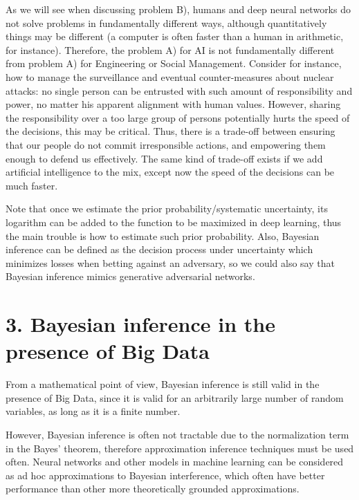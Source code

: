 \documentclass[11pt]{book}
\begin{document}
As we will see when discussing problem B), humans and deep neural
networks do not solve problems in fundamentally different ways, although
quantitatively things may be different (a computer is often faster than
a human in arithmetic, for instance). Therefore, the problem A) for AI
is not fundamentally different from problem A) for Engineering or Social
Management. Consider for instance, how to manage the surveillance and
eventual counter-measures about nuclear attacks: no single person can be
entrusted with such amount of responsibility and power, no matter his
apparent alignment with human values. However, sharing the
responsibility over a too large group of persons potentially hurts the
speed of the decisions, this may be critical. Thus, there is a trade-off
between ensuring that our people do not commit irresponsible actions,
and empowering them enough to defend us effectively. The same kind of
trade-off exists if we add artificial intelligence to the mix, except
now the speed of the decisions can be much faster.

Note that once we estimate the prior probability/systematic uncertainty,
its logarithm can be added to the function to be maximized in deep
learning, thus the main trouble is how to estimate such prior
probability. Also, Bayesian inference can be defined as the decision
process under uncertainty which minimizes losses when betting against an
adversary\cite{eaton_dutch_2004}, so we could also say that Bayesian inference mimics generative
adversarial
networks\cite{turner_metropolis-hastings_2019}.

\hypertarget{bayesian-inference-in-the-presence-of-big-data}{%
\section{3. Bayesian inference in the presence of Big
Data}\label{bayesian-inference-in-the-presence-of-big-data}}

From a mathematical point of view, Bayesian inference is still valid in
the presence of Big Data, since it is valid for an arbitrarily large
number of random variables, as long as it is a finite number.

However, Bayesian inference is often not tractable due to the
normalization term in the Bayes'
theorem\cite{jihan_re_2019}, therefore
approximation inference techniques must be used often. Neural networks
and other models in machine learning can be considered as ad hoc
approximations to Bayesian interference, which often have better
performance than other more theoretically grounded approximations.
\end{document}
